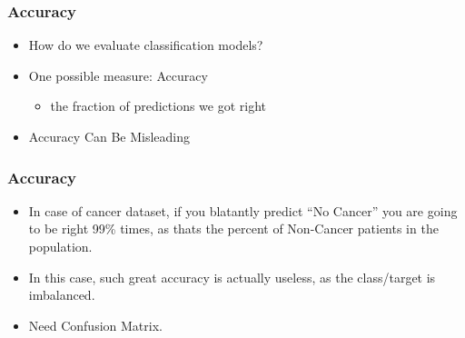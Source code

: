 \begin{frame}[fragile]\frametitle{Accuracy}
\begin{itemize}
\item How do we evaluate classification models?
\item One possible measure: Accuracy
	\begin{itemize}
	\item the fraction of predictions we got right
	\end{itemize}
\item Accuracy Can Be Misleading
\end{itemize}

\end{frame}

\begin{frame}[fragile]\frametitle{Accuracy}
\begin{itemize}
\item In case of cancer dataset, if you blatantly predict ``No Cancer'' you are going to be right 99\% times, as thats the percent of Non-Cancer patients in the population.
\item In this case, such great accuracy is actually useless, as the class/target is imbalanced. 
\item Need Confusion Matrix.
\end{itemize}

\end{frame}


